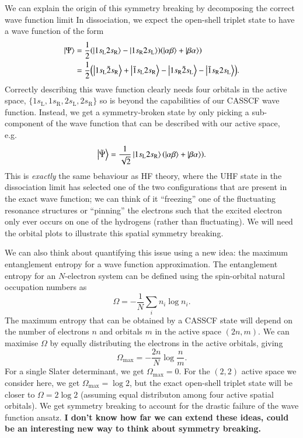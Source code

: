\documentclass[aip,jcp,reprint,noshowkeys,superscriptaddress]{revtex4-1}
\newcommand{\hugh}[1]{\textcolor{hughgreen}{#1}}
\begin{document}
\hugh{We can explain the origin of this symmetry breaking by decomposing the correct wave function limit
In dissociation, we expect the open-shell triplet state to have a wave function of the form
\begin{equation}
\begin{split}
\ket{\Psi} &= \frac{1}{2}\qty(\ket{1s_\text{L}2s_\text{R}} - \ket{1s_\text{R}2s_\text{L}})\qty(\ket{\alpha\beta} + \ket{\beta \alpha})
\\
&= \frac{1}{2}\qty(\ket{1s_\text{L}\bar{2}s_\text{R}} + \ket{\bar{1}s_\text{L}2s_\text{R}} - \ket{1s_\text{R}\bar{2}s_\text{L}} 
-  \ket{\bar{1}s_\text{R}2s_\text{L}}).
\end{split}
\end{equation}
Correctly describing this wave function clearly needs four orbitals in the active space, $\{1s_\text{L}, 1s_\text{R},2s_\text{L}, 2s_\text{R}  \}$ so is beyond the capabilities of our CASSCF wave function.
Instead, we get a symmetry-broken state by only picking a sub-component of the wave function that can be described with 
our active space, e.g.\
\begin{equation}
\ket{\tilde{\Psi}} = \frac{1}{\sqrt{2}} \ket{1s_\text{L}2s_\text{R}}\qty(\ket{\alpha\beta} + \ket{\beta \alpha}).
\end{equation}
This is \textit{exactly} the same behaviour as HF theory, where the UHF state in the dissociation limit has selected one 
of the two configurations that are present in the exact wave function; we can think of it ``freezing'' one of the 
fluctuating resonance structures or ``pinning'' the electrons such that the excited electron only ever occurs on one of the
hydrogens (rather than fluctuating).\cite{Burton_2021b}
We will need the orbital plots to illustrate this spatial symmetry breaking.
}

\hugh{We can also think about quantifying this issue using a new idea: the maximum entanglement entropy for a wave function 
approximation.
The entanglement entropy for an $N$-electron system can be defined using the spin-orbital natural occupation numbers as
\begin{equation}
\Omega = - \frac{1}{N} \sum_{i} n_i \log{n_i}.
\end{equation}
The maximum entropy that can be obtained by a CASSCF state will depend on the number of electrons $n$ and orbitals $m$ 
in the active space $(2n,m)$. 
We can maximise $\Omega$ by equally distributing the electrons in the active orbitals, giving 
\begin{equation}
\Omega_{\text{max}} = - \frac{2n}{N} \log\frac{n}{m}.
\end{equation}
For a single Slater determinant, we get $\Omega_{\text{max}} = 0$.
For the $(2,2)$ active space we consider here, we 
get $\Omega_{\text{max}} = \log 2$, but the exact open-shell triplet state will be closer to 
 $\Omega = 2 \log 2$ (assuming equal distributon among four active spatial orbitals).
We get symmetry breaking to account for the drastic failure of the wave function ansatz.
\textbf{I don't know how far we can extend these ideas, could be an interesting new way to think about symmetry breaking.}
}
\end{document}
